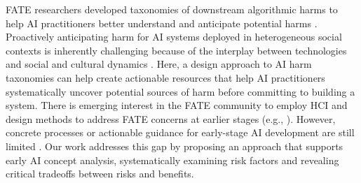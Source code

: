 FATE researchers developed taxonomies of downstream algorithmic harms to help AI practitioners better understand and anticipate potential harms \cite{Shelby2023-ff, barocas2017problem, wang2022measuring, blodgett2020language}. Proactively anticipating harm for AI systems deployed in heterogeneous social contexts is inherently challenging because of the interplay between technologies and social and cultural dynamics \cite{Shelby2023-ff, blodgett2022responsible}. Here, a design approach to AI harm taxonomies can help create actionable resources that help AI practitioners systematically uncover potential sources of harm before committing to building a system. There is emerging interest in the FATE community to employ HCI and design methods to address FATE concerns at earlier stages (e.g., \cite{klumbyte2022critical, shen2022model, Stapleton2022-eb, suresh2022towards}). 
However, concrete processes or actionable guidance for early-stage AI development are still limited \cite{coston2023validity, holstein2019improving, Raji2022-ls}. 
Our work addresses this gap by proposing an approach that supports early AI concept analysis, systematically examining risk factors and revealing critical tradeoffs between risks and benefits.

